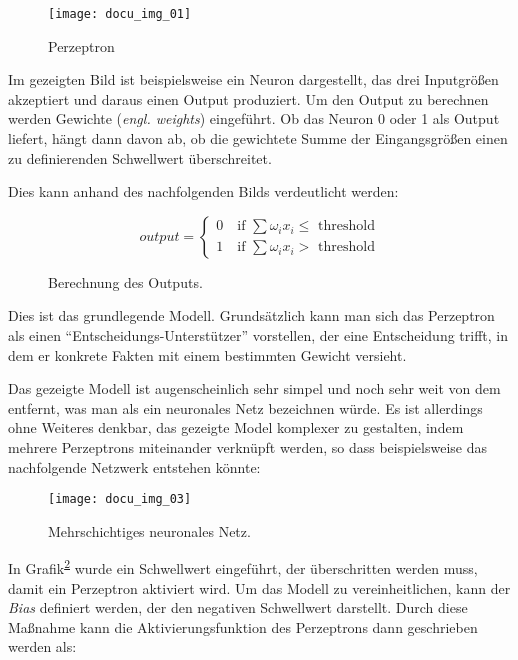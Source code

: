 \begin{figure}[h]
    \centering
    \texttt{[image: docu\_img\_01]}
    \caption{Perzeptron}
    \label{fig:perzeptron}
\end{figure}

Im gezeigten Bild ist beispielsweise ein Neuron dargestellt, das drei Inputgrößen akzeptiert und daraus einen Output
produziert. Um den Output zu berechnen werden Gewichte (\textit{engl. weights}) eingeführt. Ob das Neuron 0 oder 1 als
Output liefert, hängt dann davon ab, ob die gewichtete Summe der Eingangsgrößen einen zu definierenden Schwellwert
überschreitet.

Dies kann anhand des nachfolgenden Bilds verdeutlicht werden:

\begin{figure}[h]
    \centering
    \[ output =
      \begin{cases}
        0 \quad \text{if } \sum \omega_i x_i \leqslant \text{ threshold}\\
        1 \quad \text{if } \sum \omega_i x_i > \text{ threshold}
      \end{cases}
    \]
    \caption{Berechnung des Outputs.}
    \label{fig:neuron-three-way}
\end{figure}


Dies ist das grundlegende Modell. Grundsätzlich kann man sich das Perzeptron als einen ``Entscheidungs-Unterstützer''
vorstellen, der eine Entscheidung trifft, in dem er konkrete Fakten mit einem bestimmten Gewicht versieht.

Das gezeigte Modell ist augenscheinlich sehr simpel und noch sehr weit von dem entfernt, was man als ein neuronales
Netz bezeichnen würde. Es ist allerdings ohne Weiteres denkbar, das gezeigte Model komplexer zu gestalten, indem
mehrere Perzeptrons miteinander verknüpft werden, so dass beispielsweise das nachfolgende Netzwerk entstehen könnte:

\begin{figure}[h]
    \centering
    \texttt{[image: docu\_img\_03]}
    \caption{Mehrschichtiges neuronales Netz.}
    \label{fig:multi-layer-net}
\end{figure}



In Grafik\textsuperscript{\ref{fig:neuron-three-way}} wurde ein Schwellwert eingeführt, der überschritten werden muss, damit ein Perzeptron
aktiviert wird. Um das Modell zu vereinheitlichen, kann der \textit{Bias} definiert werden, der den
negativen Schwellwert darstellt. Durch diese Maßnahme kann die Aktivierungsfunktion des Perzeptrons dann geschrieben
werden als:

